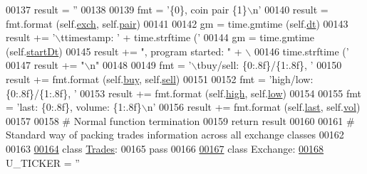 \begin{DoxyCode}
00137         result = \textcolor{stringliteral}{''}
00138         
00139         fmt    = \textcolor{stringliteral}{'\{0\}, coin pair \{1\}\(\backslash\)n'} 
00140         result = fmt.format (self.\hyperlink{classexchange_1_1_ticker_a33f33fe9a12da3ce52938afdc577c061}{exch}, self.\hyperlink{classexchange_1_1_ticker_a382f9199d13a7b5929a26065fad4e491}{pair})
00141         
00142         gm = time.gmtime (self.\hyperlink{classexchange_1_1_ticker_a45e3162d9956cee797f21d93c44c6baf}{dt})
00143         result += \textcolor{stringliteral}{'\(\backslash\)ttimestamp: '} + time.strftime (\textcolor{stringliteral}{'%
00144         gm = time.gmtime (self.\hyperlink{classexchange_1_1_ticker_a543696a29fac37ff29a3f6ef25cccd12}{startDt})
00145         result += \textcolor{stringliteral}{", program started: "} + \(\backslash\)
00146             time.strftime (\textcolor{stringliteral}{'%
00147         result += \textcolor{stringliteral}{"\(\backslash\)n"}
00148         
00149         fmt     = \textcolor{stringliteral}{'\(\backslash\)tbuy/sell: \{0:.8f\}/\{1:.8f\}, '}
00150         result += fmt.format (self.\hyperlink{classexchange_1_1_ticker_a2ca48c3fa9aba92241392a05bef39324}{buy}, self.\hyperlink{classexchange_1_1_ticker_a5ba9e257d2ed28f02528a37d9ebd793e}{sell})
00151         
00152         fmt     = \textcolor{stringliteral}{'high/low: \{0:.8f\}/\{1:.8f\}, '}
00153         result += fmt.format (self.\hyperlink{classexchange_1_1_ticker_aace381ca15468df6a40e8d86b7710a7f}{high}, self.\hyperlink{classexchange_1_1_ticker_a1c1f26a47a82fc799fcebf158e104405}{low})
00154         
00155         fmt     = \textcolor{stringliteral}{'last: \{0:.8f\}, volume: \{1:.8f\}\(\backslash\)n'}
00156         result += fmt.format (self.\hyperlink{classexchange_1_1_ticker_add7c2d95fa790dcdffddae2e584ce5f5}{last}, self.\hyperlink{classexchange_1_1_ticker_a24c0dd396aebc54c06e429a68c964ea3}{vol})
00157         
00158         \textcolor{comment}{# Normal function termination}
00159         \textcolor{keywordflow}{return} result
00160 
00161 \textcolor{comment}{# Standard way of packing trades information across all exchange classes}
00162         
00163         
\hyperlink{classexchange_1_1_trades}{00164} \textcolor{keyword}{class }\hyperlink{classexchange_1_1_trades}{Trades}:
00165     \textcolor{keywordflow}{pass}
00166 
\hyperlink{classexchange_1_1_exchange}{00167} \textcolor{keyword}{class }Exchange:
\hyperlink{classexchange_1_1_exchange_ab16df02480d727c533b02b5b7afa053b}{00168}     U\_TICKER = \textcolor{stringliteral}{''}
}}
\end{DoxyCode}
